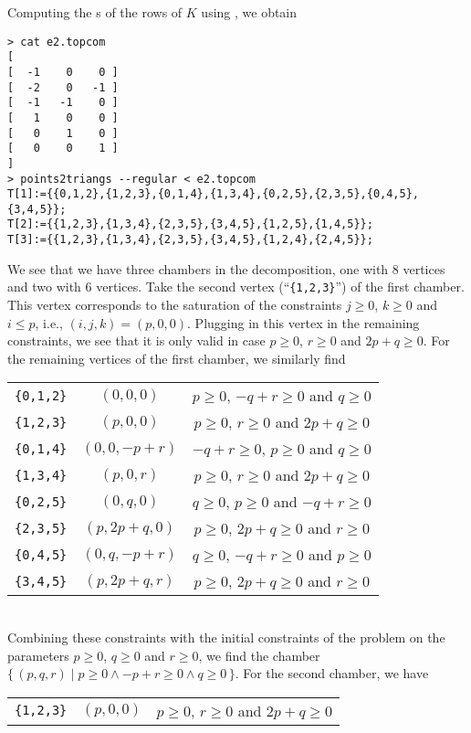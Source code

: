 \begin{example}
Computing the s of the rows of $K$
using , we obtain
\begin{verbatim}
> cat e2.topcom
[
[  -1    0    0 ]
[  -2    0   -1 ]
[  -1   -1    0 ]
[   1    0    0 ]
[   0    1    0 ]
[   0    0    1 ]
]
> points2triangs --regular < e2.topcom 
T[1]:={{0,1,2},{1,2,3},{0,1,4},{1,3,4},{0,2,5},{2,3,5},{0,4,5},{3,4,5}};
T[2]:={{1,2,3},{1,3,4},{2,3,5},{3,4,5},{1,2,5},{1,4,5}};
T[3]:={{1,2,3},{1,3,4},{2,3,5},{3,4,5},{1,2,4},{2,4,5}};
\end{verbatim}

We see that we have three chambers in the decomposition,
one with 8 vertices and two with 6 vertices.
Take the second vertex (``\verb+{1,2,3}+'') of the first chamber.
This vertex corresponds
to the saturation of the constraints $j \ge 0$, $k \ge 0$
and $i \le p$, i.e., $(i,j,k) = (p,0,0)$.  Plugging in this
vertex in the remaining constraints, we see that it is only valid
in case $p \ge 0$, $r \ge 0$ and $2p + q \ge 0$.
For the remaining vertices of the first chamber, we similarly find
\\
\begin{tabular}{ccc}
\verb+{0,1,2}+ & $(0,0,0)$ & $p \ge 0$, $-q + r \ge 0$ and $q \ge 0$
\\
\verb+{1,2,3}+ & $(p,0,0)$ & $p \ge 0$, $r \ge 0$ and $2p + q \ge 0$
\\
\verb+{0,1,4}+ & $(0,0,-p+r)$ & $-q + r \ge 0$, $p \ge 0$ and $q \ge 0$
\\
\verb+{1,3,4}+ & $(p,0,r)$ & $p \ge 0$, $r \ge 0$ and $2p + q \ge 0$
\\
\verb+{0,2,5}+ & $(0,q,0)$ & $q \ge 0$, $p \ge 0$ and $-q + r \ge 0$
\\
\verb+{2,3,5}+ & $(p, 2p+q, 0)$ & $p \ge 0$, $2p + q \ge 0$ and $r \ge 0$
\\
\verb+{0,4,5}+ & $(0, q, -p+r)$ & $q \ge 0$, $-q + r \ge 0$ and $p \ge 0$
\\
\verb+{3,4,5}+ & $(p, 2p+q, r)$ & $p \ge 0$, $2p + q \ge 0$ and $r \ge 0$
\end{tabular}
\\
Combining these constraints with the initial constraints of the problem
on the parameters
$p \ge 0$, $q \ge 0$ and $r \ge 0$, we find the chamber
$
\{\,
(p,q,r) \mid p \ge 0 \wedge -p + r \ge 0 \wedge q \ge 0
\,\}
$.
For the second chamber, we have
\\
\begin{tabular}{ccc}
\verb+{1,2,3}+ & $(p,0,0)$ & $p \ge 0$, $r \ge 0$ and $2p + q \ge 0$

\end{tabular}
\end{example}
